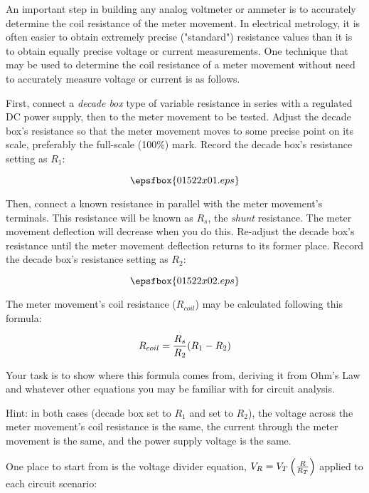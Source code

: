

An important step in building any analog voltmeter or ammeter is to accurately determine the coil resistance of the meter movement.  In electrical metrology, it is often easier to obtain extremely precise ("standard") resistance values than it is to obtain equally precise voltage or current measurements.  One technique that may be used to determine the coil resistance of a meter movement without need to accurately measure voltage or current is as follows.

First, connect a {\it decade box} type of variable resistance in series with a regulated DC power supply, then to the meter movement to be tested.  Adjust the decade box's resistance so that the meter movement moves to some precise point on its scale, preferably the full-scale (100\%) mark.  Record the decade box's resistance setting as $R_1$:

$$\epsfbox{01522x01.eps}$$

Then, connect a known resistance in parallel with the meter movement's terminals.  This resistance will be known as $R_s$, the {\it shunt} resistance.  The meter movement deflection will decrease when you do this.  Re-adjust the decade box's resistance until the meter movement deflection returns to its former place.  Record the decade box's resistance setting as $R_2$:

$$\epsfbox{01522x02.eps}$$

The meter movement's coil resistance ($R_{coil}$) may be calculated following this formula:

$$R_{coil} = {R_s \over R_2}(R_1 - R_2)$$

Your task is to show where this formula comes from, deriving it from Ohm's Law and whatever other equations you may be familiar with for circuit analysis.

Hint: in both cases (decade box set to $R_1$ and set to $R_2$), the voltage across the meter movement's coil resistance is the same, the current through the meter movement is the same, and the power supply voltage is the same.







One place to start from is the voltage divider equation, $V_R = V_T \left({R \over R_T} \right)$ applied to each circuit scenario:

